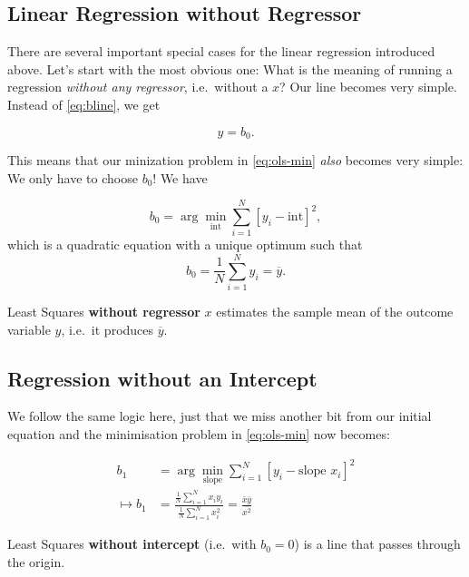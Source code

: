 \documentclass[]{book}
\newenvironment{tip}{\begin{tcolorbox}[colback=green!5!white,colframe=green]}{\end{tcolorbox}}
\begin{document}
\subsection{Linear Regression without
Regressor}\label{linear-regression-without-regressor}

There are several important special cases for the linear regression
introduced above. Let's start with the most obvious one: What is the
meaning of running a regression \emph{without any regressor},
i.e.~without a \(x\)? Our line becomes very simple. Instead of
\eqref{eq:bline}, we get

\begin{equation}
y = b_0. \label{eq:b0line}
\end{equation}

This means that our minization problem in \eqref{eq:ols-min} \emph{also}
becomes very simple: We only have to choose \(b_0\)! We have

\[
b_0 = \arg\min_{\text{int}} \sum_{i=1}^N \left[y_i - \text{int}\right]^2,
\] which is a quadratic equation with a unique optimum such that \[
b_0 = \frac{1}{N} \sum_{i=1}^N y_i = \overline{y}.
\]

\begin{tip}
Least Squares \textbf{without regressor} \(x\) estimates the sample mean
of the outcome variable \(y\), i.e.~it produces \(\overline{y}\).
\end{tip}

\subsection{Regression without an
Intercept}\label{regression-without-an-intercept}

We follow the same logic here, just that we miss another bit from our
initial equation and the minimisation problem in \eqref{eq:ols-min} now
becomes:

\begin{align}
b_1 &= \arg\min_{\text{slope}} \sum_{i=1}^N \left[y_i - \text{slope } x_i \right]^2\\
\mapsto b_1 &= \frac{\frac{1}{N}\sum_{i=1}^N x_i y_i}{\frac{1}{N}\sum_{i=1}^N x_i^2} = \frac{\bar{x} \bar{y}}{\overline{x^2}} \label{eq:b1line}
\end{align}

\begin{tip}
Least Squares \textbf{without intercept} (i.e.~with \(b_0=0\)) is a line
that passes through the origin.
\end{tip}
\end{document}

